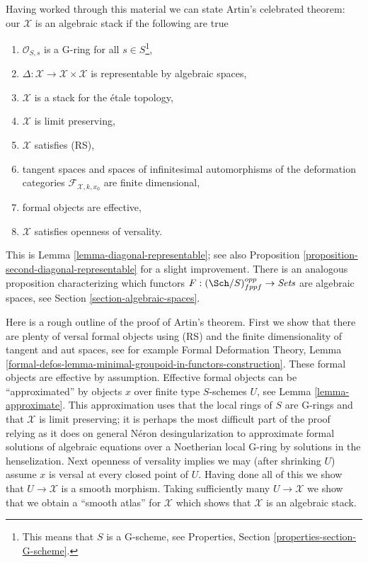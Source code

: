\medskip\noindent
Having worked through this material we can state Artin's celebrated
theorem: our $\mathcal{X}$ is an algebraic stack if the following are true
\begin{enumerate}
\item $\mathcal{O}_{S, s}$ is a G-ring for all $s \in S$\footnote{This
means that $S$ is a G-scheme, see
Properties, Section \ref{properties-section-G-scheme}.},
\item $\Delta : \mathcal{X} \to \mathcal{X} \times \mathcal{X}$
is representable by algebraic spaces,
\item $\mathcal{X}$ is a stack for the \'etale topology,
\item $\mathcal{X}$ is limit preserving,
\item $\mathcal{X}$ satisfies (RS),
\item tangent spaces and spaces of infinitesimal automorphisms
of the deformation categories $\mathcal{F}_{\mathcal{X}, k, x_0}$
are finite dimensional,
\item formal objects are effective,
\item $\mathcal{X}$ satisfies openness of versality.
\end{enumerate}
This is Lemma \ref{lemma-diagonal-representable}; see also
Proposition \ref{proposition-second-diagonal-representable}
for a slight improvement. There is an analogous proposition
characterizing which functors $F : (\Sch/S)_{fppf}^{opp} \to \textit{Sets}$
are algebraic spaces, see Section \ref{section-algebraic-spaces}.

\medskip\noindent
Here is a rough outline of the proof of Artin's theorem.
First we show that there are plenty of versal formal objects
using (RS) and the finite dimensionality of tangent and aut spaces, see
for example Formal Deformation Theory, Lemma
\ref{formal-defos-lemma-minimal-groupoid-in-functors-construction}.
These formal objects are effective by assumption.
Effective formal objects can be ``approximated'' by objects $x$ over
finite type $S$-schemes $U$, see Lemma \ref{lemma-approximate}.
This approximation uses that the local rings of $S$ are G-rings and
that $\mathcal{X}$ is limit preserving; it is perhaps the most difficult
part of the proof relying as it does on general N\'eron desingularization to
approximate formal solutions of algebraic equations over a Noetherian local
G-ring by solutions in the henselization.
Next openness of versality implies we may (after shrinking $U$)
assume $x$ is versal at every closed point of $U$.
Having done all of this we show that $U \to \mathcal{X}$
is a smooth morphism. Taking sufficiently many $U \to \mathcal{X}$
we show that we obtain a ``smooth atlas'' for $\mathcal{X}$ which shows
that $\mathcal{X}$ is an algebraic stack.

